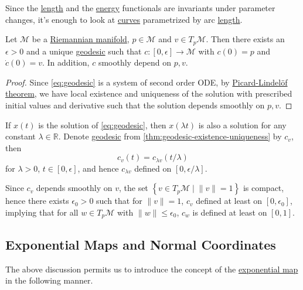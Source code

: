 Since the \hyperref[def:length]{length} and the \hyperref[def:energy]{energy} functionals are invariants under parameter changes, it's enough to look at \hyperref[def:curve]{curves} parametrized by arc \hyperref[def:length]{length}.

\begin{theorem}\label{thm:geodesic-existence-uniqueness}
	Let \(\mathcal{M} \) be a \hyperref[def:Riemannian-manifold]{Riemannian manifold}, \(p\in \mathcal{M} \) and \(v\in T_p \mathcal{M} \). Then there exists an \(\epsilon > 0\) and a unique \hyperref[def:geodesic]{geodesic} such that \(c\colon [0, \epsilon ] \to \mathcal{M} \) with \(c(0) = p\) and \(\dot{c}(0) = v\). In addition, \(c\) smoothly depend on \(p, v\).
\end{theorem}
\begin{proof}
	Since \autoref{eq:geodesic} is a system of second order ODE, by \href{https://en.wikipedia.org/wiki/Picard%E2%80%93Lindel%C3%B6f_theorem}{Picard-Lindelöf theorem}, we have local existence and uniqueness of the solution with prescribed initial values and derivative such that the solution depends smoothly on \(p, v\).
\end{proof}

If \(x(t)\) is the solution of \autoref{eq:geodesic}, then \(x(\lambda t)\) is also a solution for any constant \(\lambda \in \mathbb{R} \). Denote \hyperref[def:geodesic]{geodesic} from \autoref{thm:geodesic-existence-uniqueness} by \(c_v\), then
\[
	c_v(t) = c_{\lambda v}(t / \lambda )
\]
for \(\lambda > 0\), \(t\in [0, \epsilon ]\), and hence \(c_{\lambda v}\) defined on \([0, \epsilon / \lambda ]\).

\begin{remark}
	Since \(c_v\) depends smoothly on \(v\), the set \(\left\{ v\in T_p \mathcal{M} \mid \lVert v \rVert = 1 \right\} \) is compact, hence there exists \(\epsilon _0 > 0\) such that for \(\lVert v \rVert = 1\), \(c_v\) defined at least on \([0, \epsilon _0]\), implying that for all \(w\in T_p \mathcal{M} \) with \(\lVert w \rVert \leq \epsilon _0\), \(c_w\) is defined at least on \([0, 1]\).
\end{remark}

\subsection{Exponential Maps and Normal Coordinates}
The above discussion permits us to introduce the concept of the \hyperref[def:exponential-map]{exponential map} in the following manner.

